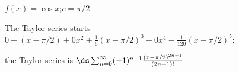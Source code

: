{$f(x) = \cos x$;\quad $c=\pi/2$
}
{The Taylor series starts $0-(x-\pi/2)+0x^2+\frac16(x-\pi/2)^3+0x^4-\frac1{120}(x-\pi/2)^5$; 

the Taylor series is $\ds \sum_{n=0}^\infty (-1)^{n+1}\frac{(x-\pi/2)^{2n+1}}{(2n+1)!}$
}